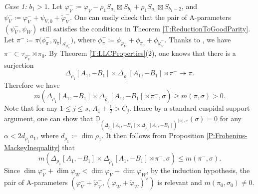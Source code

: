 \documentclass[11pt,letterpaper]{amsart}
\theoremstyle{plain}
\numberwithin{theorem}{section}
\numberwithin{equation}{subsection}
\theoremstyle{remark}
\newcommand{\D}{\mathbb{D}}
\def\calA{\mathcal{A}}
\begin{document}
\emph{Case 1:} $b_1>1$. Let $\varphi_V^-\coloneqq \varphi_V - \rho_1 S_{a_1}\boxtimes S_{b_1} + \rho_1 S_{a_1}\boxtimes S_{b_1-2}$, and $\psi_V^- \coloneqq \varphi_V^- + \psi_{V,0} + \widetilde{\varphi}_V^-$. One can easily check that the pair of A-parameters $\left(\psi_V^-,\psi_W\right)$ still satisfies the conditions in Theorem \ref{T:ReductionToGoodParity}. Let $\pi^-\coloneqq\pi\Big(\phi_\pi^-,\eta_\pi\big|_{\calA_{\phi_\pi^-}}\Big)$, where $\phi_\pi^- \coloneqq \phi_{\varphi_V^-} + \phi_{\pi_0} + \phi_{\widetilde{\varphi}_V^-}$. Thanks to \cite[Prop. 5.3]{MR2504024}, we have $\pi^-\subset\tau_{\varphi_V^-}\rtimes\pi_0$. By Theorem \ref{T:LLCProperties}(2), one knows that there is a surjection
\[
    \Delta_{\rho_1}\left[A_1,-B_1\right] \times \Delta_{\widetilde{\rho}_1}\left[A_1,-B_1\right] \rtimes \pi^-\twoheadrightarrow \pi.
\]
Therefore we have
\[
    m\left(\Delta_{\rho_1}\left[A_1,-B_1\right] \times \Delta_{\widetilde{\rho}_1}\left[A_1,-B_1\right] \rtimes \pi^-,\sigma\right) \geq m\left(\pi,\sigma\right) > 0.
\]
Note that for any $1\leq j\leq s$, $A_1+\frac{1}{2}>C_j$. Hence by a standard cuspidal support argument, one can show that $\D_{\left(\Delta_{\rho_1}\left[A_1,-B_1\right] \times \Delta_{\widetilde{\rho}_1}\left[A_1,-B_1\right]\right)^{[\alpha],\vee}}\left(\sigma\right) = 0$
for any $\alpha<2d_{\rho_1}a_1$, where $d_{\rho_1}\coloneqq \dim \rho_1$. It then follows from Proposition \ref{P:Frobenius-MackeyInequality} that
\[
    m\left(\Delta_{\rho_1}\left[A_1,-B_1\right] \times \Delta_{\widetilde{\rho}_1}\left[A_1,-B_1\right] \rtimes \pi^-,\sigma\right) \leq m\left(\pi^-,\sigma\right).
\]
Since $\dim\varphi_V^-+\dim\varphi_W<\dim\varphi_V+\dim\varphi_W$, by the induction hypothesis, the pair of A-parameters $\left(\varphi_V^-+\widetilde{\varphi}_V^-, \left(\varphi_W+\widetilde{\varphi}_W\right)^\vee\right)$ is relevant and $m\left(\pi_0,\sigma_0\right)\neq 0$.

\vskip 5pt
\end{document}
